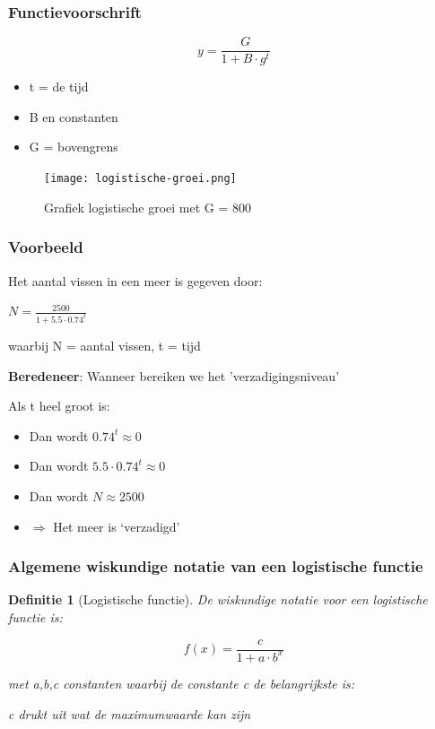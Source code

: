 \documentclass{article}
\newtheorem{theorem}{Definitie}[section]
\begin{document}
\subsubsection{Functievoorschrift}

\begin{equation}
y = \frac{G}{1 + B\cdot g^t}
\end{equation}

\begin{itemize}
    \item t = de tijd
    \item B en constanten
    \item G = bovengrens
\end{itemize}

\begin{figure}[H]
    \centering
    \texttt{[image: logistische-groei.png]}
    \caption{Grafiek logistische groei met G = 800}
\end{figure}

\subsubsection{Voorbeeld}

Het aantal vissen in een meer is gegeven door:

\begin{center}
    $N = \frac{2500}{1 + 5.5 \cdot 0.74^t}$
\end{center}

waarbij N = aantal vissen, t = tijd

\textbf{Beredeneer}: Wanneer bereiken we het 'verzadigingsniveau'

Als t heel groot is:

\begin{itemize}
    \item Dan wordt $0.74^t \approx 0$
    \item Dan wordt $5.5 \cdot 0.74^t \approx 0$
    \item Dan wordt $N \approx 2500$
    \item $\Rightarrow$ Het meer is `verzadigd'
\end{itemize}

\subsubsection{Algemene wiskundige notatie van een logistische functie}

\begin{theorem}[Logistische functie]
De wiskundige notatie voor een logistische functie is:

\begin{equation}
    f(x) = \frac{c}{1 + a\cdot b^x}
\end{equation}

met a,b,c constanten waarbij de constante c de belangrijkste is:

c drukt uit wat de maximumwaarde kan zijn
\end{theorem}
\end{document}
